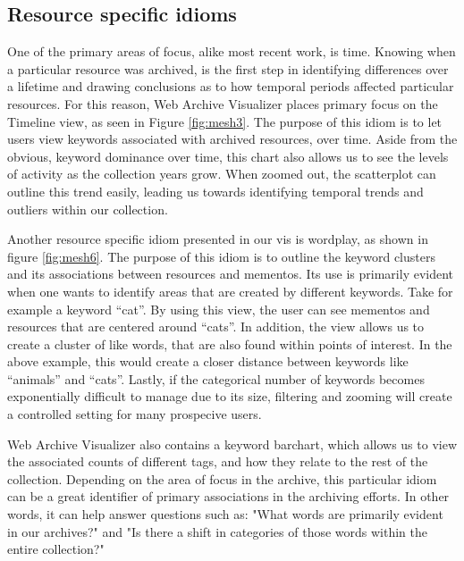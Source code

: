 \documentclass[10pt,journal,compsoc]{IEEEtran}
\begin{document}
\subsection{Resource specific idioms}
One of the primary areas of focus, alike most recent work, is time. Knowing when a particular resource was archived, is the first step in identifying differences over a lifetime and drawing conclusions as to how temporal periods affected particular resources. For this reason, Web Archive Visualizer places primary focus on the Timeline view, as seen in Figure \ref{fig:mesh3}. The purpose of this idiom is to let users view keywords associated with archived resources, over time. Aside from the obvious, keyword dominance over time, this chart also allows us to see the levels of activity as the collection years grow. When zoomed out, the scatterplot can outline this trend easily, leading us towards identifying temporal trends and outliers within our collection. \par

Another resource specific idiom presented in our vis is wordplay, as shown in figure \ref{fig:mesh6}. The purpose of this idiom is to outline the keyword clusters and its associations between resources and mementos. Its use is primarily evident when one wants to identify areas that are created by different keywords. Take for example a keyword ``cat''. By using this view, the user can see mementos and resources that are centered around ``cats''. In addition, the view allows us to create a cluster of like words, that are also found within points of interest. In the above example, this would create a closer distance between keywords like ``animals'' and ``cats''. Lastly, if the categorical number of keywords becomes exponentially difficult to manage due to its size, filtering and zooming will create a controlled setting for many prospecive users. \par

Web Archive Visualizer also contains a keyword barchart, which allows us to view the associated counts of different tags, and how they relate to the rest of the collection. Depending on the area of focus in the archive, this particular idiom can be a great identifier of primary associations in the archiving efforts. In other words, it can help answer questions such as: "What words are primarily evident in our archives?" and "Is there a shift in categories of those words within the entire collection?" \par 
\end{document}

